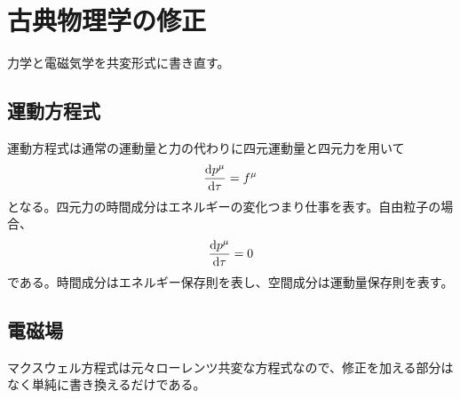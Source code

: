 \section{古典物理学の修正}
力学と電磁気学を共変形式に書き直す。

\subsection{運動方程式}
    運動方程式は通常の運動量と力の代わりに四元運動量と四元力を用いて
        \[\dv{p^\mu}{\tau} = f^\mu\]
    となる。四元力の時間成分はエネルギーの変化つまり仕事を表す。自由粒子の場合、
        \[\dv{p^\mu}{\tau} = 0\]
    である。時間成分はエネルギー保存則を表し、空間成分は運動量保存則を表す。

\subsection{電磁場}
    マクスウェル方程式は元々ローレンツ共変な方程式なので、修正を加える部分はなく単純に書き換えるだけである。

